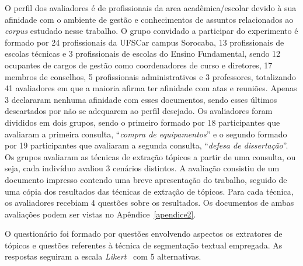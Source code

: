 O perfil dos avaliadores é de profissionais da area acadêmica/escolar devido à sua afinidade com o ambiente de gestão e conhecimentos de assuntos relacionados ao \textit{corpus} estudado nesse trabalho. O grupo convidado a participar do experimento é formado por 24 profissionais da UFSCar campus Sorocaba, 13 profissionais de escolas técnicas e 3 profissionais de escolas do Ensino Fundamental, sendo 12 ocupantes de cargos de gestão como coordenadores de curso e diretores, 17 membros de conselhos, 5 profissionais administrativos e 3 professores, totalizando 41 avaliadores em que a maioria afirma ter afinidade com atas e reuniões. Apenas 3 declararam nenhuma afinidade com esses documentos, sendo esses últimos descartados por não se adequarem ao perfil desejado. Os avaliadores foram divididos em dois grupos, sendo o primeiro formado por 18 participantes que avaliaram a primeira consulta, ``\textit{compra de equipamentos}'' e o segundo formado por 19 participantes que avaliaram a segunda consulta, ``\textit{defesa de dissertação}''. Os grupos avaliaram as técnicas de extração tópicos a partir de uma consulta, ou seja, cada indivíduo avaliou 3 cenários distintos. A avaliação consistiu de um documento impresso contendo uma breve apresentação do trabalho, seguido de uma cópia dos resultados das técnicas de extração de tópicos. Para cada técnica, os avaliadores recebiam 4 questões sobre os resultados. Os documentos de ambas avaliações podem ser vistas no Apêndice~\ref{apendice2}.


O questionário foi formado por questões envolvendo aspectos os extratores de tópicos e questões referentes à técnica de segmentação textual empregada.
As respostas seguiram a escala \textit{Likert}~\cite{Norman2010} com 5 alternativas. 



